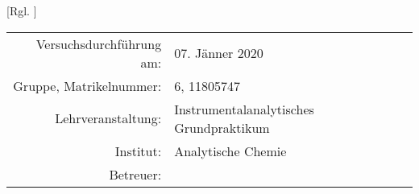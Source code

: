 [Rgl. ]{}{}
  
\maketitle %
  
\begin{center}
  \begin{tabular}{r p{4cm}}
    Versuchsdurchführung am: & 07. Jänner 2020\\ %
    Gruppe, Matrikelnummer: & 6, 11805747 \\
    Lehrveranstaltung: & Instrumentalanalytisches Grundpraktikum \\
    Institut: & Analytische Chemie \\
    Betreuer: &  %
  \end{tabular}
\end{center}

\begin{abstract}
  
\end{abstract}